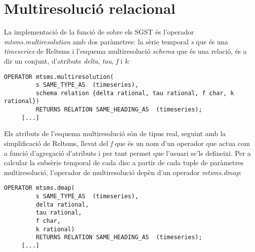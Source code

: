 {%









\section{Multiresolució relacional}


La implementació de la funció de 
sobre els \gls{SGST} és l'operador \emph{mtsms.multiresolution} amb
dos paràmetres: la sèrie temporal \emph{s} que és una
\emph{timeseries} de Reltsms i l'esquema multiresolució \emph{schema}
que és una relació, és a dir un conjunt, d'atributs \emph{delta},
\emph{tau}, \emph{f} i \emph{k}:

\begin{lstlisting}[style=tutorialD]
OPERATOR mtsms.multiresolution(
         s SAME_TYPE_AS  (timeseries),   
         schema relation {delta rational, tau rational, f char, k rational}) 
         RETURNS RELATION SAME_HEADING_AS  (timeseries);
     [...]
\end{lstlisting}
       



Els atributs de l'esquema multiresolució són de tipus real, seguint
amb la simplificació de Reltsms, llevat del \emph{f} que és un nom
d'un operador que actua com a funció d'agregació d'atributs i per tant
permet que l'usuari se'ls defineixi. Per a calcular la subsèrie
temporal de cada disc a partir de cada tuple de paràmetres
multiresolució, l'operador de multiresolució depèn d'un operador
\emph{mtsms.dmap}:
\begin{lstlisting}[style=tutorialD]
OPERATOR mtsms.dmap(
         s SAME_TYPE_AS  (timeseries),   
         delta rational, 
         tau rational,         
         f char,         
         k rational) 
         RETURNS RELATION SAME_HEADING_AS  (timeseries);
     [...]
\end{lstlisting}


}
